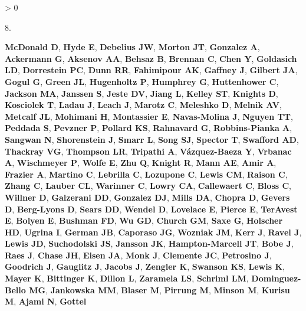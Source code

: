 \documentclass[
]{article}
\newlength{\cslhangindent}
\newlength{\csllabelwidth}
\newenvironment{CSLReferences}[3] %
 {%
  \setlength{\parindent}{0pt}
  \ifodd #1 \everypar{\setlength{\hangindent}{\cslhangindent}}\ignorespaces\fi
  \ifnum #2 > 0
  \setlength{\parskip}{#2\baselineskip}
  \fi
 }%
 {}
\newcommand{\CSLLeftMargin}[1]{\parbox[t]{\csllabelwidth}{#1}}
\newcommand{\CSLRightInline}[1]{\parbox[t]{\linewidth - \csllabelwidth}{#1}}
\begin{document}
\begin{CSLReferences}{0}{0}
\leavevmode\hypertarget{ref-McDonald2018}{}%
\CSLLeftMargin{8. }
\CSLRightInline{\textbf{McDonald D}, \textbf{Hyde E}, \textbf{Debelius
JW}, \textbf{Morton JT}, \textbf{Gonzalez A}, \textbf{Ackermann G},
\textbf{Aksenov AA}, \textbf{Behsaz B}, \textbf{Brennan C}, \textbf{Chen
Y}, \textbf{Goldasich LD}, \textbf{Dorrestein PC}, \textbf{Dunn RR},
\textbf{Fahimipour AK}, \textbf{Gaffney J}, \textbf{Gilbert JA},
\textbf{Gogul G}, \textbf{Green JL}, \textbf{Hugenholtz P},
\textbf{Humphrey G}, \textbf{Huttenhower C}, \textbf{Jackson MA},
\textbf{Janssen S}, \textbf{Jeste DV}, \textbf{Jiang L}, \textbf{Kelley
ST}, \textbf{Knights D}, \textbf{Kosciolek T}, \textbf{Ladau J},
\textbf{Leach J}, \textbf{Marotz C}, \textbf{Meleshko D}, \textbf{Melnik
AV}, \textbf{Metcalf JL}, \textbf{Mohimani H}, \textbf{Montassier E},
\textbf{Navas-Molina J}, \textbf{Nguyen TT}, \textbf{Peddada S},
\textbf{Pevzner P}, \textbf{Pollard KS}, \textbf{Rahnavard G},
\textbf{Robbins-Pianka A}, \textbf{Sangwan N}, \textbf{Shorenstein J},
\textbf{Smarr L}, \textbf{Song SJ}, \textbf{Spector T}, \textbf{Swafford
AD}, \textbf{Thackray VG}, \textbf{Thompson LR}, \textbf{Tripathi A},
\textbf{Vázquez-Baeza Y}, \textbf{Vrbanac A}, \textbf{Wischmeyer P},
\textbf{Wolfe E}, \textbf{Zhu Q}, \textbf{Knight R}, \textbf{Mann AE},
\textbf{Amir A}, \textbf{Frazier A}, \textbf{Martino C},
\textbf{Lebrilla C}, \textbf{Lozupone C}, \textbf{Lewis CM},
\textbf{Raison C}, \textbf{Zhang C}, \textbf{Lauber CL},
\textbf{Warinner C}, \textbf{Lowry CA}, \textbf{Callewaert C},
\textbf{Bloss C}, \textbf{Willner D}, \textbf{Galzerani DD},
\textbf{Gonzalez DJ}, \textbf{Mills DA}, \textbf{Chopra D},
\textbf{Gevers D}, \textbf{Berg-Lyons D}, \textbf{Sears DD},
\textbf{Wendel D}, \textbf{Lovelace E}, \textbf{Pierce E},
\textbf{TerAvest E}, \textbf{Bolyen E}, \textbf{Bushman FD}, \textbf{Wu
GD}, \textbf{Church GM}, \textbf{Saxe G}, \textbf{Holscher HD},
\textbf{Ugrina I}, \textbf{German JB}, \textbf{Caporaso JG},
\textbf{Wozniak JM}, \textbf{Kerr J}, \textbf{Ravel J}, \textbf{Lewis
JD}, \textbf{Suchodolski JS}, \textbf{Jansson JK},
\textbf{Hampton-Marcell JT}, \textbf{Bobe J}, \textbf{Raes J},
\textbf{Chase JH}, \textbf{Eisen JA}, \textbf{Monk J}, \textbf{Clemente
JC}, \textbf{Petrosino J}, \textbf{Goodrich J}, \textbf{Gauglitz J},
\textbf{Jacobs J}, \textbf{Zengler K}, \textbf{Swanson KS},
\textbf{Lewis K}, \textbf{Mayer K}, \textbf{Bittinger K}, \textbf{Dillon
L}, \textbf{Zaramela LS}, \textbf{Schriml LM}, \textbf{Dominguez-Bello
MG}, \textbf{Jankowska MM}, \textbf{Blaser M}, \textbf{Pirrung M},
\textbf{Minson M}, \textbf{Kurisu M}, \textbf{Ajami N}, \textbf{Gottel
}}
\end{CSLReferences}
\end{document}
